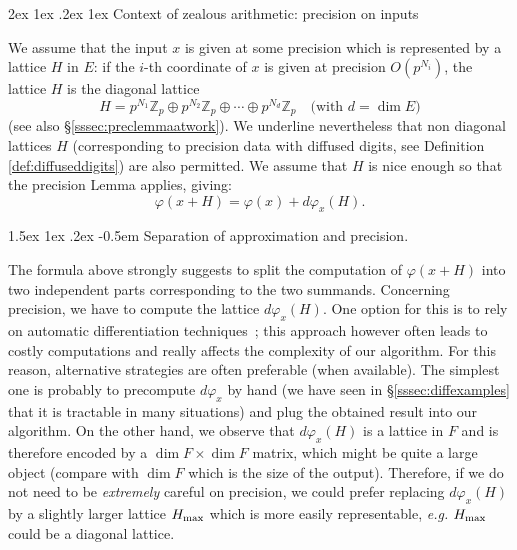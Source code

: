 \documentclass[11pt]{article}
\makeatletter
\numberwithin{equation}{section}
\numberwithin{figure}{section}
\renewcommand\paragraph{\@startsection{paragraph}{4}{\z@}%
                                    {2ex \@plus1ex \@minus.2ex}%
                                    {1ex}%
                                    {\normalfont\normalsize\bfseries}}
\renewcommand\subparagraph{\@startsection{subparagraph}{5}{\z@}%
                                       {1.5ex \@plus1ex \@minus .2ex}%
                                       {-0.5em}%
                                      {\normalfont\normalsize\it}}
\theoremstyle{definition}
\newcommand{\Z}{\mathbb Z}
\newcommand{\Zp}{\Z_p}
\renewcommand{\max}{\text{\rm max}}
\makeatother
\begin{document}
\paragraph{Context of zealous arithmetic: precision on inputs}

We assume that the input $x$ is given at some precision which is 
represented by a lattice $H$ in $E$: if the $i$-th coordinate of $x$ is 
given at precision $O(p^{N_i})$, the lattice $H$ is the diagonal lattice
$$H = p^{N_1} \Zp \oplus p^{N_2} \Zp \oplus \cdots \oplus
p^{N_d} \Zp \quad \text{(with $d = \dim E$)}$$
(see also \S \ref{sssec:preclemmaatwork}). We underline nevertheless 
that non diagonal lattices $H$ (corresponding to precision data with
diffused digits, see Definition \ref{def:diffuseddigits}) are also 
permitted. We assume that $H$ is nice enough so that the precision 
Lemma applies, giving:
\begin{equation}
\label{eq:adapt}
\varphi(x+H) = \varphi(x) + d\varphi_x(H).
\end{equation}

\subparagraph{Separation of approximation and precision.}

The formula above strongly suggests to split the computation of 
$\varphi(x{+}H)$ into two independent parts corresponding to the two 
summands. Concerning precision, we have to compute the lattice $d 
\varphi_x(H)$. 
One option for this 
is to rely on automatic differentiation techniques~\cite{BaBrChDi00,Ne10}; 
this approach however often leads to costly computations and 
really affects the complexity of our algorithm. 
For this reason, alternative strategies are often preferable (when 
available). The simplest one is probably to precompute $d \varphi_x$ by 
hand (we have seen in \S \ref{sssec:diffexamples} that it is tractable 
in many situations) and plug the obtained result into our algorithm.
On the other hand, we observe that $d \varphi_x(H)$ is a lattice in $F$ 
and is therefore encoded by a $\dim F \times \dim F$ matrix, which might 
be quite a large object (compare with $\dim F$ which is the size of 
the output). Therefore, if we do not need to be \emph{extremely} careful
on precision, we could prefer replacing $d \varphi_x(H)$ by a slightly
larger lattice $H_\max$ which is more easily representable, \emph{e.g.}
$H_\max$ could be a diagonal lattice.
\end{document}

